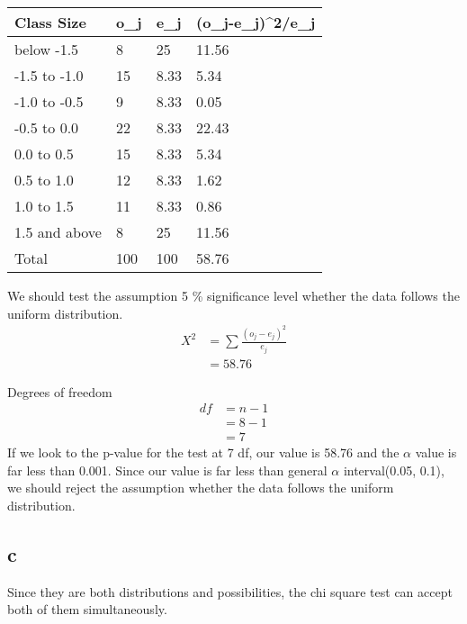 \documentclass[11pt]{article}
\begin{document}
\begin{table}[H]
\centering
\begin{tabular}{|l|l|l|l|}
\hline
Class Size    & o\_j & e\_j  & (o\_j-e\_j)\textasciicircum{}2/e\_j \\ \hline
below -1.5    & 8    & 25  & 11.56                                \\ 
\hline
-1.5 to -1.0  & 15   & 8.33 & 5.34                                \\ \hline
-1.0 to -0.5  & 9    & 8.33 & 0.05                                \\ \hline
-0.5 to 0.0   & 22   & 8.33 & 22.43                                \\ \hline
0.0 to 0.5    & 15   & 8.33 & 5.34                                \\ \hline
0.5 to 1.0    & 12   & 8.33 & 1.62                                \\ \hline
1.0 to 1.5    & 11   & 8.33  & 0.86                                \\ \hline
1.5 and above    & 8    & 25  & 11.56                                \\ \hline
Total         & 100  & 100   & 58.76                              \\ \hline
\end{tabular}
\end{table}

We should test the assumption 5 \% significance level whether the data follows the uniform distribution.\\
\begin{align*}
X^2 &= \sum \frac{(o_j - e_j)^2}{e_j}\\
&= 58.76
\end{align*}

Degrees of freedom \\
\begin{align*}
df &= n-1\\
&= 8 - 1\\
&= 7
\end{align*}
If we look to the p-value for the test at 7 df, our value is 58.76 and the $\alpha$ value is far less than 0.001. Since our value is far less than general $\alpha$ interval(0.05, 0.1), we should reject the assumption whether the data follows the uniform distribution.
\subsection*{c}
Since they are both distributions and possibilities, the chi square test can accept both of them simultaneously.
\end{document}
